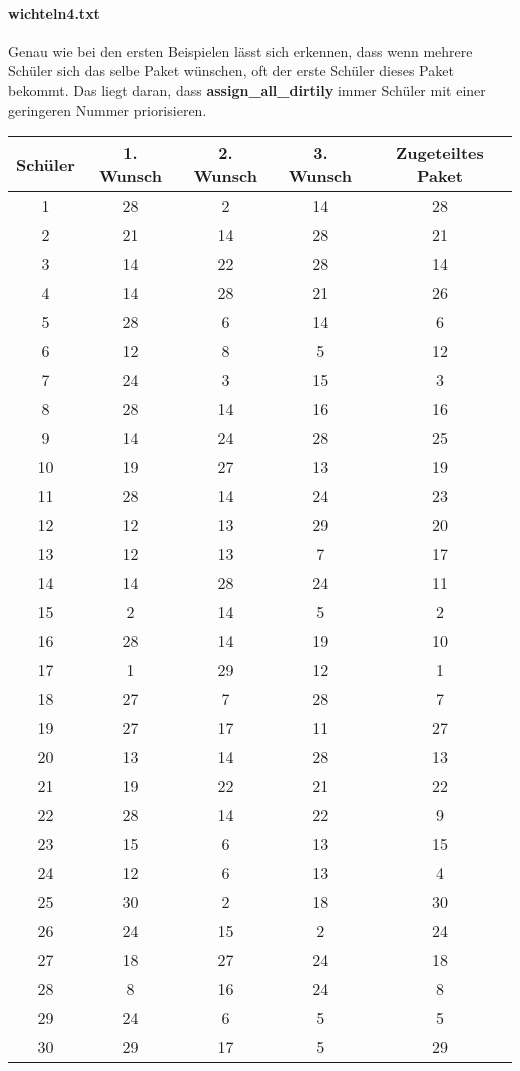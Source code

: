 \documentclass[a4paper,10pt,ngerman]{scrartcl}
\begin{document}
\paragraph{wichteln4.txt}
Genau wie bei den ersten Beispielen lässt sich erkennen, dass wenn mehrere Schüler sich das selbe Paket wünschen, oft der erste Schüler dieses Paket bekommt.
Das liegt daran, dass \textbf{assign\_all\_dirtily} immer Schüler mit einer geringeren Nummer priorisieren.
\begin{longtable}[c]{c|c|c|c|c}
    Schüler & 1. Wunsch & 2. Wunsch & 3. Wunsch & Zugeteiltes Paket \\
    \hline
    \endhead
    1 & 28 & 2 & 14 & 28 \\
    2 & 21 & 14 & 28 & 21 \\
    3 & 14 & 22 & 28 & 14 \\
    4 & 14 & 28 & 21 & 26 \\
    5 & 28 & 6 & 14 & 6 \\
    6 & 12 & 8 & 5 & 12 \\
    7 & 24 & 3 & 15 & 3 \\
    8 & 28 & 14 & 16 & 16 \\
    9 & 14 & 24 & 28 & 25 \\
    10 & 19 & 27 & 13 & 19 \\
    11 & 28 & 14 & 24 & 23 \\
    12 & 12 & 13 & 29 & 20 \\
    13 & 12 & 13 & 7 & 17 \\
    14 & 14 & 28 & 24 & 11 \\
    15 & 2 & 14 & 5 & 2 \\
    16 & 28 & 14 & 19 & 10 \\
    17 & 1 & 29 & 12 & 1 \\
    18 & 27 & 7 & 28 & 7 \\
    19 & 27 & 17 & 11 & 27 \\
    20 & 13 & 14 & 28 & 13 \\
    21 & 19 & 22 & 21 & 22 \\
    22 & 28 & 14 & 22 & 9 \\
    23 & 15 & 6 & 13 & 15 \\
    24 & 12 & 6 & 13 & 4 \\
    25 & 30 & 2 & 18 & 30 \\
    26 & 24 & 15 & 2 & 24 \\
    27 & 18 & 27 & 24 & 18 \\
    28 & 8 & 16 & 24 & 8 \\
    29 & 24 & 6 & 5 & 5 \\
    30 & 29 & 17 & 5 & 29
\end{longtable}
\end{document}

